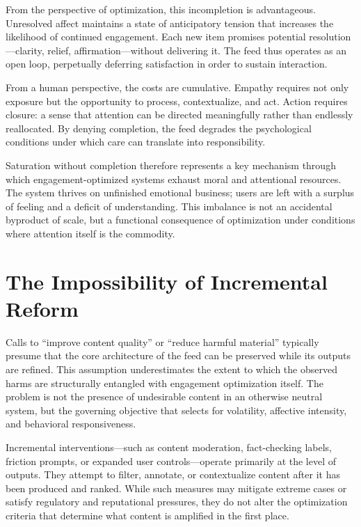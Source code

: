 \documentclass[12pt]{article}
\begin{document}
From the perspective of optimization, this incompletion is advantageous. Unresolved affect maintains a state of anticipatory tension that increases the likelihood of continued engagement. Each new item promises potential resolution—clarity, relief, affirmation—without delivering it. The feed thus operates as an open loop, perpetually deferring satisfaction in order to sustain interaction.

From a human perspective, the costs are cumulative. Empathy requires not only exposure but the opportunity to process, contextualize, and act. Action requires closure: a sense that attention can be directed meaningfully rather than endlessly reallocated. By denying completion, the feed degrades the psychological conditions under which care can translate into responsibility.

Saturation without completion therefore represents a key mechanism through which engagement-optimized systems exhaust moral and attentional resources. The system thrives on unfinished emotional business; users are left with a surplus of feeling and a deficit of understanding. This imbalance is not an accidental byproduct of scale, but a functional consequence of optimization under conditions where attention itself is the commodity.

\section{The Impossibility of Incremental Reform}

Calls to ``improve content quality'' or ``reduce harmful material'' typically presume that the core architecture of the feed can be preserved while its outputs are refined. This assumption underestimates the extent to which the observed harms are structurally entangled with engagement optimization itself. The problem is not the presence of undesirable content in an otherwise neutral system, but the governing objective that selects for volatility, affective intensity, and behavioral responsiveness.

Incremental interventions—such as content moderation, fact-checking labels, friction prompts, or expanded user controls—operate primarily at the level of outputs. They attempt to filter, annotate, or contextualize content after it has been produced and ranked. While such measures may mitigate extreme cases or satisfy regulatory and reputational pressures, they do not alter the optimization criteria that determine what content is amplified in the first place.
\end{document}
